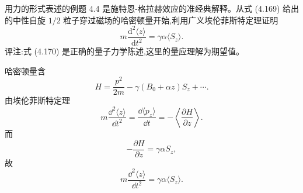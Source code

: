 \begin{question}
用力的形式表述的例题 4.4 是施特恩-格拉赫效应的准经典解释。从式 (4.169) 给出的中性自旋 $1/2$ 粒子穿过磁场的哈密顿量开始,利用广义埃伦菲斯特定理证明
\[
m\frac{\mathrm d^2\langle z\rangle}{\mathrm dt^2}=\gamma\alpha\langle S_z\rangle.
\]
评注:式 (4.170) 是正确的量子力学陈述,这里的量应理解为期望值。

\par\smallskip
{}

\begin{solution}

哈密顿量含
\[
H=\frac{p^2}{2m}-\gamma(B_0+\alpha z)S_z+\cdots.
\]
由埃伦菲斯特定理
\[
m\frac{\dd^2\langle z\rangle}{\dd t^2}=\frac{\dd\langle p_z\rangle}{\dd t}
=-\left\langle\frac{\partial H}{\partial z}\right\rangle.
\]
而
\[
-\frac{\partial H}{\partial z}=\gamma\alpha S_z,
\]
故
\[
m\frac{\dd^2\langle z\rangle}{\dd t^2}=\gamma\alpha\langle S_z\rangle.
\]

\end{solution}
\end{question}

